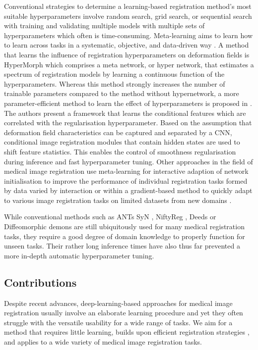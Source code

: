 Conventional strategies to determine a learning-based registration method's most suitable hyperparameters involve random search, grid search, or sequential search with training and validating multiple models with multiple sets of hyperparameters which often is time-consuming. Meta-learning aims to learn how to learn across tasks in a systematic, objective, and data-driven way \citep{vanschoren2019meta}. A method that learns the influence of registration hyperparameters on deformation fields is HyperMorph \citep{hoopes2021hypermorph} which comprises a meta network, or hyper network, that estimates a spectrum of registration models by learning a continuous function of the hyperparameters. Whereas this method strongly increases the number of trainable parameters compared to the method without hypernetwork, a more parameter-efficient method to learn the effect of hyperparameters is proposed in \citep{mok2021conditional}. The authors present a framework that learns the conditional features which are correlated with the regularisation hyperparameter. Based on the assumption that deformation field characteristics can be captured and separated by a CNN, conditional image registration modules that contain hidden states are used to shift feature statistics. This enables the control of smoothness regularisation during inference and fast hyperparameter tuning. Other approaches in the field of medical image registration use meta-learning for interactive adaption of network initialisation to improve the performance of individual registration tasks formed by data varied by interaction \citep{baum2023meta} or within a gradient-based method to quickly adapt to various image registration tasks on limited datasets from new domains \citep{park2022meta}.

While conventional methods such as ANTs SyN \citep{avants2008symmetric}, NiftyReg \citep{modat2010fast}, Deeds \citep{heinrich2015multi} or Diffeomorphic demons \citep{vercauteren2009diffeomorphic} are still ubiquitously used for many medical registration tasks, they require a good degree of domain knowledge to properly function for unseen tasks. Their rather long inference times have also thus far prevented a more in-depth automatic hyperparameter tuning.

\subsection{Contributions}
Despite recent advances, deep-learning-based approaches for medical image registration usually involve an elaborate learning procedure and yet they often struggle with the versatile usability for a wide range of tasks. We aim for a method that requires little learning, builds upon efficient registration strategies \citep{heinrich2014non}, and applies to a wide variety of medical image registration tasks. 

